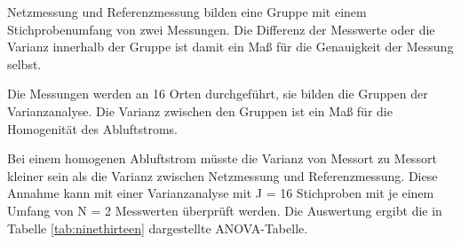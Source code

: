 \noindent Netzmessung und Referenzmessung bilden eine Gruppe mit einem Stichprobenumfang von zwei Messungen. Die Differenz der Messwerte oder die Varianz innerhalb der Gruppe ist damit ein Ma{\ss} f\"{u}r die Genauigkeit der Messung selbst. \newline

\noindent Die Messungen werden an 16 Orten durchgef\"{u}hrt, sie bilden die Gruppen der Varianzanalyse. Die Varianz zwischen den Gruppen ist ein Ma{\ss} f\"{u}r die Homogenit\"{a}t des Abluftstroms.\newline

\noindent Bei einem homogenen Abluftstrom m\"{u}sste die Varianz von Messort zu Messort kleiner sein als die Varianz zwischen Netzmessung und Referenzmessung. Diese Annahme kann mit einer Varianzanalyse mit J = 16 Stichproben mit je einem Umfang von N = 2 Messwerten \"{u}berpr\"{u}ft werden. Die Auswertung ergibt die in Tabelle \ref{tab:ninethirteen} dargestellte ANOVA-Tabelle.

\clearpage

